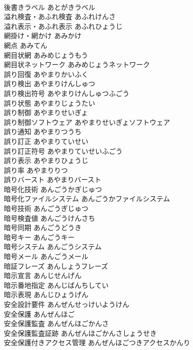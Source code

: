 \documentclass[8pt]{extreport}
\begin{document}
\begin{CJK}{UTF8}{min}
\\	後書きラベル	あとがきラベル	
\\	溢れ検査・あふれ検査	あふれけんさ	
\\	溢れ表示・あふれ表示	あふれひょうじ	
\\	網掛け・網かけ	あみかけ	
\\	網点	あみてん	
\\	網目状網	あみめじょうもう	
\\	網目状ネットワーク	あみめじょうネットワーク	
\\	誤り回復	あやまりかいふく	
\\	誤り検出	あやまりけんしゅつ	
\\	誤り検出符号	あやまりけんしゅつふごう	
\\	誤り状態	あやまりじょうたい	
\\	誤り制御	あやまりせいぎょ	
\\	誤り制御ソフトウェア	あやまりせいぎょソフトウェア	
\\	誤り通知	あやまりつうち	
\\	誤り訂正	あやまりていせい	
\\	誤り訂正符号	あやまりていせいふごう	
\\	誤り表示	あやまりひょうじ	
\\	誤り率	あやまりりつ	
\\	誤りバースト	あやまりバースト	
\\	暗号化技術	あんごうかぎじゅつ	
\\	暗号化ファイルシステム	あんごうかファイルシステム	
\\	暗号技術	あんごうぎじゅつ	
\\	暗号検査値	あんごうけんさち	
\\	暗号同期	あんごうどうき	
\\	暗号キー	あんごうキー	
\\	暗号システム	あんごうシステム	
\\	暗号メール	あんごうメール	
\\	暗証フレーズ	あんしょうフレーズ	
\\	暗示宣言	あんじせんげん	
\\	暗示番地指定	あんじばんちしてい	
\\	暗示表現	あんじひょうげん	
\\	安全設計要件	あんぜんせっけいようけん	
\\	安全保護	あんぜんほご	
\\	安全保護監査	あんぜんほごかんさ	
\\	安全保護監査証跡	あんぜんほごかんさしょうせき	
\\	安全保護付きアクセス管理	あんぜんほごつきアクセスかんり	

\end{CJK}
\end{document}

